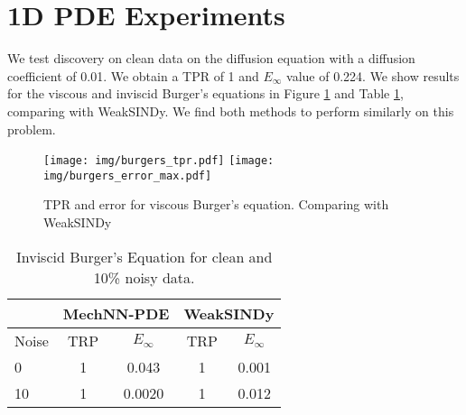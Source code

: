 \section{1D PDE Experiments}
\label{sec:app:1d-experiments}
We test discovery on clean data on the diffusion equation with a diffusion coefficient of 0.01.
We obtain a TPR of 1 and $E_\infty$ value of 0.224.
We show results for the viscous and inviscid Burger's equations in Figure \ref{fig:burgers-viscous} and Table \ref{tab:burgers-inviscid}, comparing with WeakSINDy.
We find both methods to perform similarly on this problem.

\begin{figure}[h!]
  \vskip -0.05in
  \centering
    \texttt{[image: img/burgers\_tpr.pdf]}
    \texttt{[image: img/burgers\_error\_max.pdf]}
  \vskip -0.1in
  \caption{TPR and error for viscous Burger's equation. Comparing with WeakSINDy}
  \vskip -0.05in
  \label{fig:burgers-viscous}
\end{figure}


\begin{table}[h!] %
  \centering
  \caption{Inviscid Burger's Equation for clean and 10\% noisy data.}
  \vskip 0.05in
  \begin{footnotesize}
  \begin{tabular}{lcccc}
    \toprule
    & \multicolumn{2}{c}{MechNN-PDE} & \multicolumn{2}{c}{WeakSINDy} \\
    \midrule
    Noise & TRP & $E_\infty$ & TRP & $E_\infty$\\
    \midrule
    0&1 &0.043 & 1 & 0.001\\
    10&1 &0.0020&1 & 0.012 \\
    \bottomrule
  \end{tabular}
  \label{tab:burgers-inviscid}
  \end{footnotesize}%
  \vskip -0.15in
\end{table}


